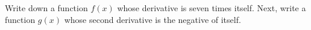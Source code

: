 Write down a function $f(x)$ whose derivative is seven times itself.  Next, write a function $g(x)$ whose second derivative is the negative of itself.
